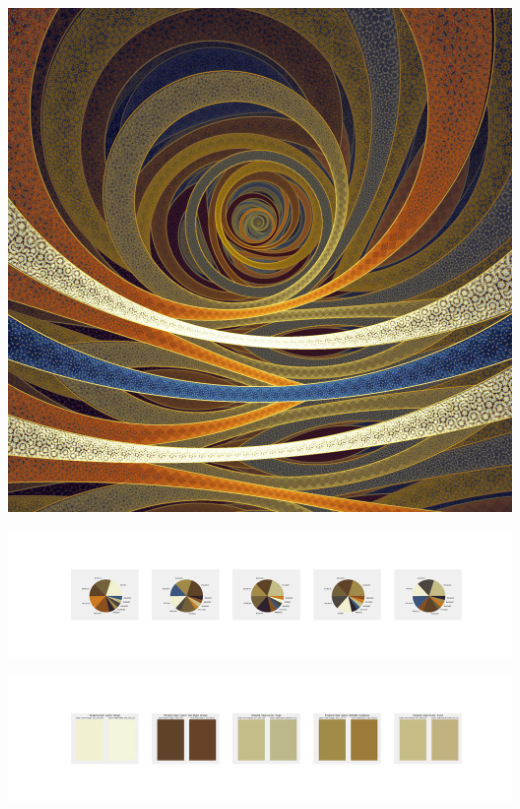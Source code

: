 \documentclass[11pt]{article}
\begin{document}
\begin{landscape}
    \begin{center}
    \includegraphics[width=\textwidth]{./nbimg/file (342).jpg}
    \end{center}

    \begin{center}
    \includegraphics[width=250mm]{./nbimg/pie-270.jpg}
    \end{center}

    \begin{center}
    \includegraphics[width=250mm]{./nbimg/peak-270.jpg}
    \end{center}
    


\end{landscape}
\end{document}
